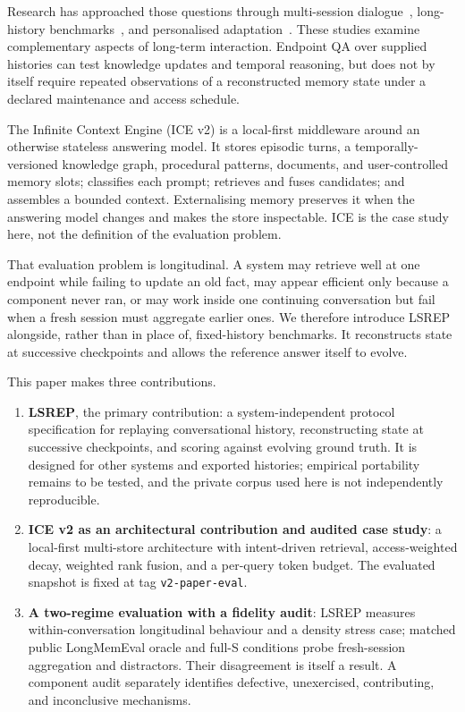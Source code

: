 \documentclass[twoside,11pt]{article}
\begin{document}
Research has approached those questions through multi-session dialogue~\citep{xu2022msc,jang2023chronicles}, long-history benchmarks~\citep{maharana2024locomo,wu2025longmemeval}, and personalised adaptation~\citep{salemi2024lamp}. These studies examine complementary aspects of long-term interaction. Endpoint QA over supplied histories can test knowledge updates and temporal reasoning, but does not by itself require repeated observations of a reconstructed memory state under a declared maintenance and access schedule.

The Infinite Context Engine (ICE v2) is a local-first middleware around an otherwise stateless answering model. It stores episodic turns, a temporally-versioned knowledge graph, procedural patterns, documents, and user-controlled memory slots; classifies each prompt; retrieves and fuses candidates; and assembles a bounded context. Externalising memory preserves it when the answering model changes and makes the store inspectable. ICE is the case study here, not the definition of the evaluation problem.

That evaluation problem is longitudinal. A system may retrieve well at one endpoint while failing to update an old fact, may appear efficient only because a component never ran, or may work inside one continuing conversation but fail when a fresh session must aggregate earlier ones. We therefore introduce LSREP alongside, rather than in place of, fixed-history benchmarks. It reconstructs state at successive checkpoints and allows the reference answer itself to evolve.

This paper makes three contributions.

\begin{enumerate}[leftmargin=*]
  \item \textbf{LSREP}, the primary contribution: a system-independent protocol specification for replaying conversational history, reconstructing state at successive checkpoints, and scoring against evolving ground truth. It is designed for other systems and exported histories; empirical portability remains to be tested, and the private corpus used here is not independently reproducible.
  \item \textbf{ICE v2 as an architectural contribution and audited case study}: a local-first multi-store architecture with intent-driven retrieval, access-weighted decay, weighted rank fusion, and a per-query token budget. The evaluated snapshot is fixed at tag \texttt{v2-paper-eval}.
  \item \textbf{A two-regime evaluation with a fidelity audit}: LSREP measures within-conversation longitudinal behaviour and a density stress case; matched public LongMemEval oracle and full-S conditions probe fresh-session aggregation and distractors. Their disagreement is itself a result. A component audit separately identifies defective, unexercised, contributing, and inconclusive mechanisms.
\end{enumerate}
\end{document}
